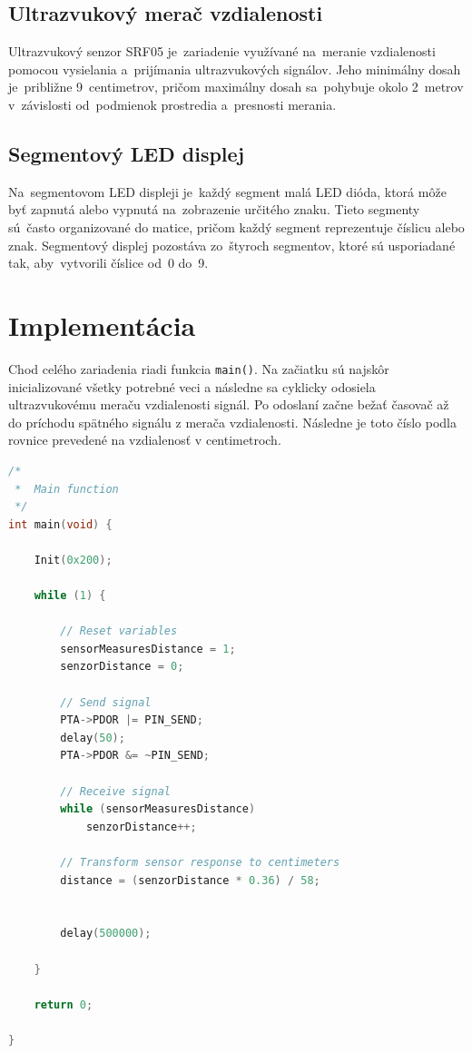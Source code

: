 \documentclass[a4paper, 11pt]{article}
\begin{document}
    \subsection{Ultrazvukový merač vzdialenosti}
    Ultrazvukový senzor SRF05 je~zariadenie využívané na~meranie vzdialenosti pomocou vysielania a~prijímania ultrazvukových signálov. Jeho minimálny dosah
    je~približne 9~centimetrov, pričom maximálny dosah sa~pohybuje okolo 2~metrov v~závislosti od~podmienok prostredia a~presnosti merania.\cite{SRF05}

    \subsection{Segmentový LED displej}
    Na~segmentovom LED displeji je~každý segment malá LED dióda, ktorá môže byť zapnutá alebo vypnutá na~zobrazenie určitého znaku.
    Tieto segmenty sú~často organizované do matice, pričom každý segment reprezentuje číslicu alebo znak.
    Segmentový displej pozostáva zo~štyroch segmentov, ktoré sú usporiadané tak, aby~vytvorili číslice od~0 do~9. 

    \section{Implementácia}
    Chod celého zariadenia riadi funkcia \texttt{main()}. Na začiatku sú najskôr inicializované všetky potrebné veci a následne
    sa cyklicky odosiela ultrazvukovému meraču vzdialenosti signál. Po odoslaní začne bežať časovač až do príchodu spätného signálu z merača
    vzdialenosti. Následne je toto číslo podla rovnice prevedené na vzdialenosť v centimetroch.
    \begin{lstlisting}[language=C, caption={Funkcia main()}]
/*
 * 	Main function
 */
int main(void) {

	Init(0x200);

    while (1) {

		// Reset variables
		sensorMeasuresDistance = 1;
		senzorDistance = 0;

    	// Send signal
    	PTA->PDOR |= PIN_SEND;
    	delay(50);
    	PTA->PDOR &= ~PIN_SEND;

		// Receive signal
		while (sensorMeasuresDistance)
			senzorDistance++;

		// Transform sensor response to centimeters
		distance = (senzorDistance * 0.36) / 58;


		delay(500000);

    }

    return 0;

}
    \end{lstlisting}
\end{document}
